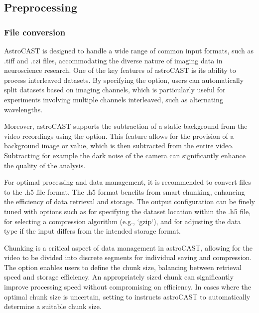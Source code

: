 \subsection{Preprocessing}

\subsubsection{File conversion}

AstroCAST is designed to handle a wide range of common input formats, such as .tiff and .czi files, accommodating the diverse nature of imaging data in neuroscience research. One of the key features of astroCAST is its ability to process interleaved datasets. By specifying the  option, users can automatically split datasets based on imaging channels, which is particularly useful for experiments involving multiple channels interleaved, such as alternating wavelengths.

Moreover, astroCAST supports the subtraction of a static background from the video recordings using the  option. This feature allows for the provision of a background image or value, which is then subtracted from the entire video. Subtracting for example the dark noise of the camera can significantly enhance the quality of the analysis.

For optimal processing and data management, it is recommended to convert files to the .h5 file format. The .h5 format benefits from smart chunking, enhancing the efficiency of data retrieval and storage. The output configuration can be finely tuned with options such as  for specifying the dataset location within the .h5 file,  for selecting a compression algorithm (e.g., `gzip`), and  for adjusting the data type if the input differs from the intended storage format.

Chunking is a critical aspect of data management in astroCAST, allowing for the video to be divided into discrete
segments for individual saving and compression. The  option enables users to define the chunk size, balancing between retrieval speed and storage efficiency. An appropriately sized chunk can significantly improve processing speed without compromising on efficiency. In cases where the optimal chunk size is uncertain, setting  to  instructs astroCAST to automatically determine a suitable chunk size.

